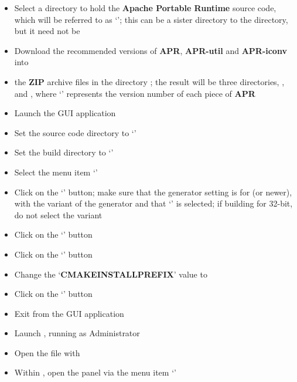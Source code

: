 \begin{itemize}
\item Select a directory to hold the \textbf{Apache Portable Runtime} source code, which
will be referred to as `'; this can be a sister directory to the
 directory, but it need not be
\item\exSp{}Download the recommended versions of \textbf{APR}, \textbf{APR-util} and
\textbf{APR-iconv} into 
\item\exSp{} the \textbf{ZIP} archive files in the directory
; the result will be three directories, ,\\
 and , where `'
represents the version number of each piece of \textbf{APR}
\item Launch the  GUI application
\item\exSp{}Set the source code directory to `'
\item\exSp{}Set the build directory to `'
\item\exSp{}Select the menu item `'
\item\exSp{}Click on the `' button; make sure that the generator
setting is for  (or newer), with the  variant of
the generator and that `' is selected; if building
for 32-bit, do not select the  variant
\item\exSp{}Click on the `' button
\item\exSp{}Click on the `' button
\item\exSp{}Change the `\textbf{CMAKE\fUS{}INSTALL\fUS{}PREFIX}' value to
\item\exSp{}Click on the `' button
\item\exSp{}Exit from the  GUI application
\item\exSp{}Launch , running as Administrator
\item\exSp{}Open the file
 with 
\item\exSp{}Within , open the  panel via the
menu item `'

\end{itemize}
